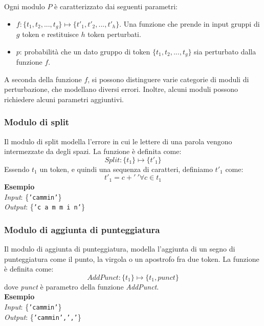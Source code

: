 \documentclass[12pt]{article}
\begin{document}
Ogni modulo $P$ è caratterizzato dai seguenti parametri:
\begin{itemize}
\item $f: \{ t_1,t_2,..., t_g  \} \mapsto \{ t'_1,t'_2,..., t'_h  \} $. Una funzione che prende in input gruppi di $g$ token e restituisce $h$ token perturbati.
\item $p$: probabilità che un dato gruppo di token $\{ t_1,t_2,..., t_g  \}$ sia perturbato dalla funzione $f$.
\end{itemize}

A seconda della funzione $f$, si possono distinguere varie categorie di moduli di perturbazione, che modellano diversi errori. Inoltre, alcuni moduli possono richiedere alcuni parametri aggiuntivi.

\subsubsection{Modulo di split}
Il modulo di split modella l'errore in cui le lettere di una parola vengono intermezzate da degli spazi. La funzione è definita come:
\begin{equation}
\textit{Split}: \{ t_1 \} \mapsto \{ t'_1 \}
\end{equation}
Essendo $t_1$ un token, e quindi una sequenza di caratteri, definiamo $t'_1$ come:
\begin{equation}
t'_1 = c + '\ ' \forall c \in t_1
\end{equation}
\textbf{Esempio}\\
\textit{Input}: \{\texttt{'cammin'}\}\\
\textit{Output}: \{\texttt{'c a m m i n'}\}

\subsubsection{Modulo di aggiunta di punteggiatura}
Il modulo di aggiunta di punteggiatura, modella l'aggiunta di un segno di punteggiatura come il punto, la virgola o un apostrofo fra due token. La funzione è definita come:
\begin{equation}
\textit{AddPunct}: \{ t_1 \} \mapsto \{ t_1, \textit{punct} \}
\end{equation}
dove \textit{punct} è parametro della funzione \textit{AddPunct}.\\
\textbf{Esempio}\\
\textit{Input}: \{\texttt{'cammin'}\}\\
\textit{Output}: \{\texttt{'cammin',','}\}
\end{document}
